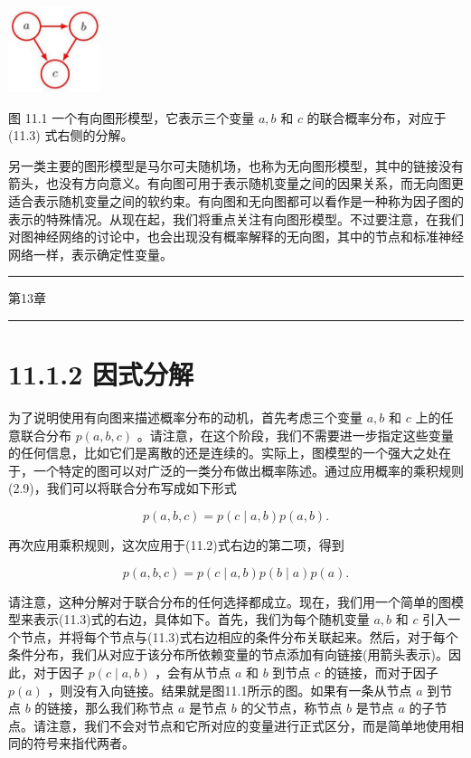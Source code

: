 \documentclass[10pt]{report}
\newcommand{\HRule}{\begin{center}\rule{0.9\linewidth}{0.2mm}\end{center}}
\begin{document}
\begin{center}
\includegraphics[max width=0.2\textwidth]{images/0194e279-9b28-703a-88f4-c3ac21e2010d_346_1340_347_208_194_0.jpg}
\end{center}
\hspace*{3em} 

图 11.1 一个有向图形模型，它表示三个变量 \(a,b\) 和 \(c\) 的联合概率分布，对应于 (11.3) 式右侧的分解。

另一类主要的图形模型是马尔可夫随机场，也称为无向图形模型，其中的链接没有箭头，也没有方向意义。有向图可用于表示随机变量之间的因果关系，而无向图更适合表示随机变量之间的软约束。有向图和无向图都可以看作是一种称为因子图的表示的特殊情况。从现在起，我们将重点关注有向图形模型。不过要注意，在我们对图神经网络的讨论中，也会出现没有概率解释的无向图，其中的节点和标准神经网络一样，表示确定性变量。

\HRule

第13章

\HRule

\section*{11.1.2 因式分解}

为了说明使用有向图来描述概率分布的动机，首先考虑三个变量 \(a,b\) 和 \(c\) 上的任意联合分布 \(p\left( {a,b,c}\right)\) 。请注意，在这个阶段，我们不需要进一步指定这些变量的任何信息，比如它们是离散的还是连续的。实际上，图模型的一个强大之处在于，一个特定的图可以对广泛的一类分布做出概率陈述。通过应用概率的乘积规则(2.9)，我们可以将联合分布写成如下形式

\[
p\left( {a,b,c}\right)  = p\left( {c \mid  a,b}\right) p\left( {a,b}\right) . \tag{11.2}
\]

再次应用乘积规则，这次应用于(11.2)式右边的第二项，得到

\[
p\left( {a,b,c}\right)  = p\left( {c \mid  a,b}\right) p\left( {b \mid  a}\right) p\left( a\right) . \tag{11.3}
\]

请注意，这种分解对于联合分布的任何选择都成立。现在，我们用一个简单的图模型来表示(11.3)式的右边，具体如下。首先，我们为每个随机变量 \(a,b\) 和 \(c\) 引入一个节点，并将每个节点与(11.3)式右边相应的条件分布关联起来。然后，对于每个条件分布，我们从对应于该分布所依赖变量的节点添加有向链接(用箭头表示)。因此，对于因子 \(p\left( {c \mid  a,b}\right)\) ，会有从节点 \(a\) 和 \(b\) 到节点 \(c\) 的链接，而对于因子 \(p\left( a\right)\) ，则没有入向链接。结果就是图11.1所示的图。如果有一条从节点 \(a\) 到节点 \(b\) 的链接，那么我们称节点 \(a\) 是节点 \(b\) 的父节点，称节点 \(b\) 是节点 \(a\) 的子节点。请注意，我们不会对节点和它所对应的变量进行正式区分，而是简单地使用相同的符号来指代两者。
\end{document}
